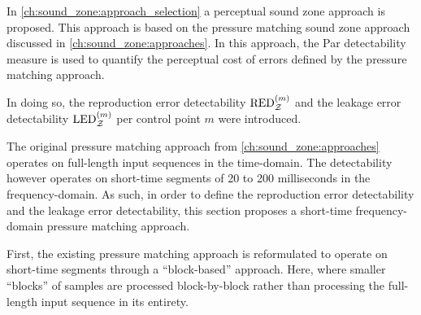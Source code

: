 In \autoref{ch:sound_zone:approach_selection} a perceptual sound zone approach is proposed.
This approach is based on the pressure matching sound zone approach discussed in \autoref{ch:sound_zone:approaches}.
In this approach, the Par detectability measure is used to quantify the perceptual cost of errors defined by the pressure matching approach.

In doing so, the reproduction error detectability $\text{RED}_{\mathcal{Z}}^{(m)}$ and the leakage error detectability $\text{LED}_{\mathcal{Z}}^{(m)}$
per control point $m$ were introduced.

The original pressure matching approach from \autoref{ch:sound_zone:approaches} operates on full-length input sequences in the time-domain.
The detectability however operates on short-time segments of 20 to 200 milliseconds in the frequency-domain.
As such, in order to define the reproduction error detectability and the leakage error detectability, this section proposes a short-time
frequency-domain pressure matching approach.

First, the existing pressure matching approach is reformulated to operate on short-time segments through a ``block-based'' approach. 
Here, where smaller ``blocks'' of samples are processed block-by-block rather than processing the full-length input sequence in its entirety.





